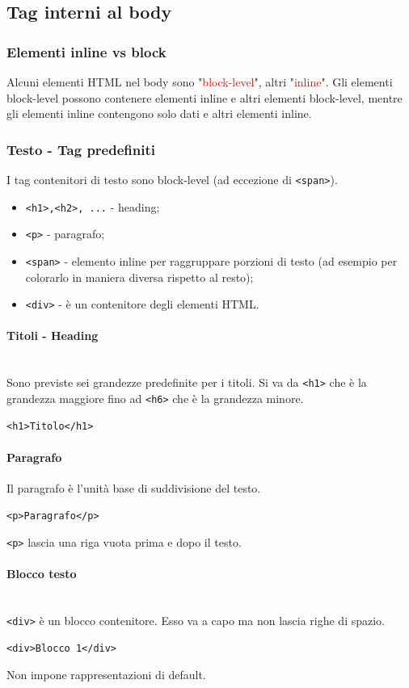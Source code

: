 \documentclass{article}
\begin{document}
\subsection{Tag interni al body}
\subsubsection{Elementi inline vs block}
Alcuni elementi HTML nel body sono "\textcolor{red}{block-level}", altri "\textcolor{red}{inline}". Gli elementi block-level possono contenere elementi inline e altri elementi block-level, mentre gli elementi
inline contengono solo dati e altri elementi inline.
\subsubsection{Testo - Tag predefiniti}
I tag contenitori di testo sono block-level (ad eccezione di \texttt{<span>}).
\begin{itemize}
    \item \texttt{<h1>,<h2>, ...} - heading;
    \item \texttt{<p>} - paragrafo;
    \item \texttt{<span>} - elemento inline per raggruppare porzioni di testo (ad esempio per colorarlo in maniera diversa rispetto al resto);
    \item \texttt{<div>} - è un contenitore degli elementi HTML.
\end{itemize}
\paragraph{Titoli - Heading} \mbox{}\\
Sono previste sei grandezze predefinite per i titoli. Si va da \texttt{<h1>} che è la grandezza maggiore fino ad \texttt{<h6>} che è la grandezza minore.
\begin{lstlisting}[style=htmlstyle]
<h1>Titolo</h1>
\end{lstlisting}
\paragraph{Paragrafo} \mbox{}
Il paragrafo è l'unità base di suddivisione del testo.
\begin{lstlisting}[style=htmlstyle]
<p>Paragrafo</p>
\end{lstlisting}
\texttt{<p>} lascia una riga vuota prima e dopo il testo.
\paragraph{Blocco testo} \mbox{} \\
\texttt{<div>} è un blocco contenitore. Esso va a capo ma non lascia righe di spazio.
\begin{lstlisting}[style=htmlstyle]
<div>Blocco 1</div>
\end{lstlisting}
Non impone rappresentazioni di default. 
\end{document}
